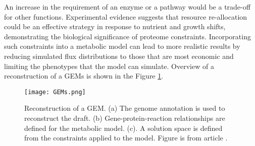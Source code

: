 An increase in the requirement of an enzyme or a pathway would be a trade-off for other functions. Experimental evidence suggests that resource re-allocation could be an effective strategy in response to nutrient and growth shifts, demonstrating the biological significance of proteome constraints. \cite{Chen2023} Incorporating such constraints into a metabolic model can lead to more realistic results by reducing simulated flux distributions to those that are most economic and limiting the phenotypes that the model can simulate. \cite{Kerkhoven2022}
Overview of a reconstruction of a GEMs is shown in the Figure \ref{GEMs}.
\begin{figure}[H]
    \texttt{[image: GEMs.png]}
    \caption{Reconstruction of a GEM. (a) The genome annotation is used 
    to reconstruct the draft. (b) Gene-protein-reaction relationships are defined for the metabolic model. 
     (c). A solution space is defined from the constraints applied to the model. Figure is from article \cite{Kerkhoven2014}.}
    \label{GEMs}
\end{figure}




